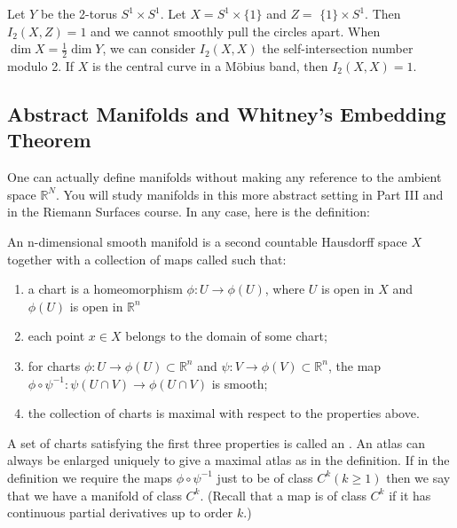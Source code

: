 \documentclass[a4paper, 10pt, twocolumn]{amsart}
\begin{document}
\begin{example}
    Let $Y$ be the 2-torus $S^{1} \times S^{1}$. Let $X=S^{1} \times\{1\}$ and $Z=$ $\{1\} \times S^{1}$. Then $I_{2}(X, Z)=1$ and we cannot smoothly pull the circles apart. When $\operatorname{dim} X=\frac{1}{2} \operatorname{dim} Y$, we can consider $I_{2}(X, X)$ the self-intersection number modulo 2. If $X$ is the central curve in a Möbius band, then $I_{2}(X, X)=1$.
\end{example}

\subsection{Abstract Manifolds and Whitney's Embedding Theorem}

One can actually define manifolds without making any reference to the ambient space $\mathbb{R}^{N}$. You will study manifolds in this more abstract setting in Part III and in the Riemann Surfaces course. In any case, here is the definition:

\begin{definition}
    An n-dimensional smooth manifold is a second countable Hausdorff space $X$ together with a collection of maps called  such that:
    \begin{enumerate}
        \item a chart is a homeomorphism $\phi: U \rightarrow \phi(U)$, where $U$ is open in $X$ and $\phi(U)$ is open in $\mathbb{R}^{n}$
        \item each point $x \in X$ belongs to the domain of some chart;
        \item for charts $\phi: U \rightarrow \phi(U) \subset \mathbb{R}^{n}$ and $\psi: V \rightarrow \phi(V) \subset \mathbb{R}^{n}$, the map $\phi \circ \psi^{-1}: \psi(U \cap V) \rightarrow \phi(U \cap V)$ is smooth;
        \item the collection of charts is maximal with respect to the properties above.
    \end{enumerate}
    A set of charts satisfying the first three properties is called an . An atlas can always be enlarged uniquely to give a maximal atlas as in the definition. If in the definition we require the maps $\phi \circ \psi^{-1}$ just to be of class $C^{k}(k \geq 1)$ then we say that we have a manifold of class $C^{k}$. (Recall that a map is of class $C^{k}$ if it has continuous partial derivatives up to order $k$.)
\end{definition}
\end{document}
